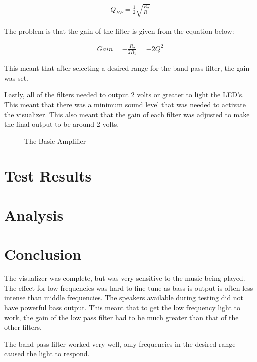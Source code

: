 \documentclass{article}
\begin{document}
\begin{eqnarray}
Q_{BP} = \frac{1}{2}\sqrt{\frac{R_2}{R_1}}
\end{eqnarray}


The problem is that the gain of the filter is given from the equation below:

\begin{eqnarray}
Gain = -\frac{R_2}{2R_1} = -2Q^2
\end{eqnarray}

This meant that after selecting a desired range for the band pass filter, the gain was set. 

Lastly, all of the filters needed to output 2 volts or greater to light the LED’s. This meant that there was a minimum sound level that was needed to activate the visualizer. This also meant that the gain of each filter was adjusted to make the final output to be around 2 volts.
\begin{figure}
\begin{minipage}[b]{1.0\linewidth}
  \centering
  \centerline{}
\caption{The Basic Amplifier}
\end{minipage}

\end{figure}



\section{Test Results}



\section{Analysis}



\section{Conclusion}
The visualizer was complete, but was very sensitive to the music being played. The effect for low frequencies was hard to fine tune as bass is output is often less intense than middle frequencies. The speakers available during testing did not have powerful bass output. This meant that to get the low frequency light to work, the gain of the low pass filter had to be much greater than that of the other filters.
 
The band pass filter worked very well, only frequencies in the desired range caused the light to respond.
\end{document}
